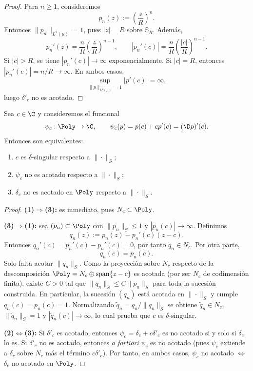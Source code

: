 \begin{proof}
	Para $n\ge 1$, consideremos
	\[
		p_n(z):=\left(\frac{z}{R}\right)^n.
	\]
	Entonces $\|p_n\|_{L^2(\mu)}=1$, pues $|z|=R$ sobre $\mathbb{S}_R$. Además,
	\[
		p_n'(z)=\frac{n}{R}\left(\frac{z}{R}\right)^{n-1},
		\qquad
		|p_n'(c)|=\frac{n}{R}\left(\frac{|c|}{R}\right)^{n-1}.
	\]
	Si $|c|>R$, se tiene $|p_n'(c)|\to\infty$ exponencialmente. Si $|c|=R$,
	entonces $|p_n'(c)|=n/R\to\infty$. En ambos casos,
	\[
		\sup_{\|p\|_{L^2(\mu)}=1}|p'(c)|=\infty,
	\]
	luego $\delta'_c$ no es acotado.
\end{proof}


\begin{prop}\label{prop:caracterizacion_psi_c}
	Sea $c\in\C$ y consideremos el funcional
	\[
		\psi_c:\Poly\to\C,\qquad \psi_c(p)=p(c)+cp'(c)=(\D p)'(c).
	\]
	Entonces son equivalentes:
	\begin{enumerate}
		\item $c$ es $\delta$-singular respecto a $\|\cdot\|_S$;
		\item $\psi_c$ no es acotado respecto a $\|\cdot\|_S$;
		\item $\delta_c$ no es acotado en $\Poly$ respecto a $\|\cdot\|_S$.
	\end{enumerate}
\end{prop}

\begin{proof}
	\textbf{(1)$\Rightarrow$(3):} es inmediato, pues $N_c\subset\Poly$.

	\textbf{(3)$\Rightarrow$(1):} sea $(p_n)\subset\Poly$ con
	$\|p_n\|_S\le 1$ y $|p_n(c)|\to\infty$. Definimos
	\[
		q_n(z):=p_n(z)-p_n'(c)(z-c).
	\]
	Entonces $q_n'(c)=p_n'(c)-p_n'(c)=0$, por tanto $q_n\in N_c$.
	Por otra parte,
	\[
		q_n(c)=p_n(c).
	\]
	Solo falta acotar $\|q_n\|_S$. Como la proyección sobre $N_c$ respecto de la descomposición
	$\Poly=N_c\oplus\operatorname{span}\{z-c\}$ es acotada (por ser $N_c$ de codimensión
	finita), existe $C>0$ tal que $\|q_n\|_S\le C\|p_n\|_S$ para toda la sucesión
	construida. En particular, la sucesión $(q_n)$ está acotada en $\|\cdot\|_S$
	y cumple $q_n(c)=p_n(c)=1$. Normalizando $\tilde q_n=q_n/\|q_n\|_S$ se obtiene
	$\tilde q_n\in N_c$, $\|\tilde q_n\|_S=1$ y $|\tilde q_n(c)|\to\infty$,
	lo cual prueba que $c$ es $\delta$-singular.

	\textbf{(2)$\iff$(3):} Si $\delta'_c$ es acotado, entonces
	$\psi_c=\delta_c+c\delta'_c$ es no acotado si y solo si $\delta_c$ lo es.
	Si $\delta'_c$ no es acotado, entonces \emph{a fortiori} $\psi_c$ es no
	acotado (pues $\psi_c$ extiende a $\delta_c$ sobre $N_c$ más el término
	$c\delta'_c$). Por tanto, en ambos casos, $\psi_c$ no acotado
	$\Longleftrightarrow$ $\delta_c$ no acotado en $\Poly$.
\end{proof}

